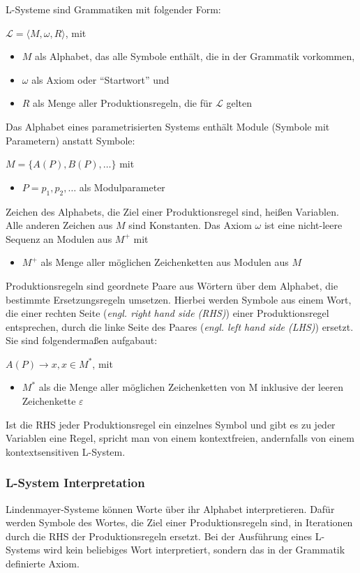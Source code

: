 L-Systeme sind Grammatiken mit folgender Form:
\begin{center}
    $\mathcal{L}=\langle M,\omega,R \rangle$, mit
    \begin{itemize}
        \item $M$ als Alphabet, das alle Symbole enthält, die in der Grammatik vorkommen,
        \item $\omega$ als Axiom oder "`Startwort"' und
        \item $R$ als Menge aller Produktionsregeln, die für $\mathcal{L}$ gelten
    \end{itemize}
\end{center}
Das Alphabet eines parametrisierten Systems enthält Module (Symbole mit Parametern) anstatt Symbole:
\begin{center}
    $M=\{A(P),B(P),\dots\}$ mit
    \begin{itemize}
        \item $P=p_1,p_2,\dots$ als Modulparameter
    \end{itemize}
\end{center}
Zeichen des Alphabets, die Ziel einer Produktionsregel sind, heißen Variablen.
Alle anderen Zeichen aus $M$ sind Konstanten.
Das Axiom $\omega$ ist eine nicht-leere Sequenz an Modulen aus $M^+$ mit
\begin{itemize}
    \item $M^+$ als Menge aller möglichen Zeichenketten aus Modulen aus $M$
\end{itemize}
Produktionsregeln sind geordnete Paare aus Wörtern über dem Alphabet, die bestimmte Ersetzungsregeln umsetzen.
Hierbei werden Symbole aus einem Wort, die einer rechten Seite (\textit{engl. right hand side (RHS)}) einer
Produktionsregel entsprechen, durch die linke Seite des Paares (\textit{engl. left hand side (LHS)}) ersetzt.
Sie sind folgendermaßen aufgabaut:
\begin{center}
    $A(P)\rightarrow x,x\in M^*$, mit
    \begin{itemize}
        \item $M^*$ als die Menge aller möglichen Zeichenketten von M inklusive der leeren Zeichenkette $\varepsilon$
    \end{itemize}
\end{center}
Ist die RHS jeder Produktionsregel ein einzelnes Symbol und gibt es zu jeder Variablen eine Regel, spricht man
von einem kontextfreien, andernfalls von einem kontextsensitiven L-System.

\subsubsection*{L-System Interpretation}
Lindenmayer-Systeme können Worte über ihr Alphabet interpretieren.
Dafür werden Symbole des Wortes, die Ziel einer Produktionsregeln sind, in Iterationen durch die RHS
der Produktionsregeln ersetzt.
Bei der Ausführung eines L-Systems wird kein beliebiges Wort interpretiert, sondern das in der
Grammatik definierte Axiom.

